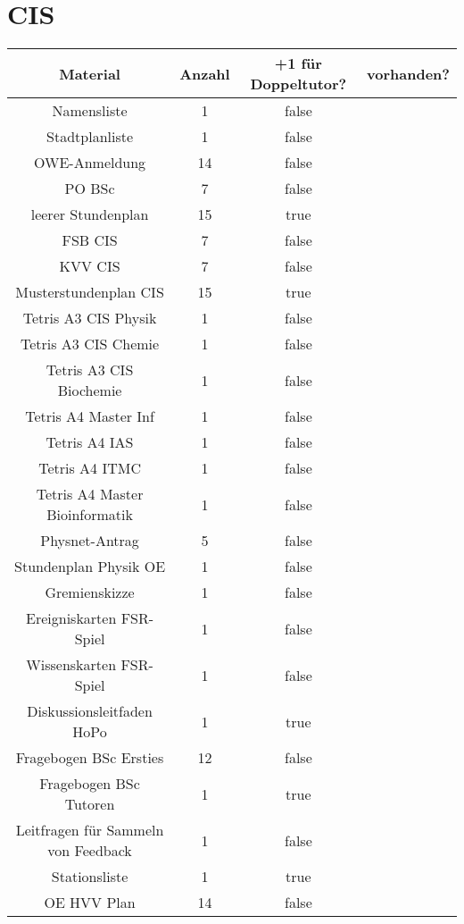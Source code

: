 \documentclass[10pt,a4paper,oneside,ngerman,numbers=noenddot]{scrartcl}
\begin{document}
\section{CIS}

	\begin{tabular}{c|c|c|c}
		\textbf{Material} & \textbf{Anzahl} & \textbf{+1 für Doppeltutor?} & \textbf{vorhanden?} \\
		\hline
		Namensliste & 1 & false & \\
		\hline
		Stadtplanliste & 1 & false & \\
		\hline
		OWE-Anmeldung & 14 & false & \\
		\hline
		PO BSc & 7 & false & \\
		\hline
		leerer Stundenplan & 15 & true & \\
		\hline
		FSB CIS & 7 & false & \\
		\hline
		KVV CIS & 7 & false & \\
		\hline
		Musterstundenplan CIS & 15 & true & \\
		\hline
		Tetris A3 CIS Physik & 1 & false & \\
		\hline
		Tetris A3 CIS Chemie & 1 & false & \\
		\hline
		Tetris A3 CIS Biochemie & 1 & false & \\
		\hline
		Tetris A4 Master Inf & 1 & false & \\
		\hline
		Tetris A4 IAS & 1 & false & \\
		\hline
		Tetris A4 ITMC & 1 & false & \\
		\hline
		Tetris A4 Master Bioinformatik & 1 & false & \\
		\hline
		Physnet-Antrag & 5 & false & \\
		\hline
		Stundenplan Physik OE & 1 & false & \\
		\hline
		Gremienskizze & 1 & false & \\
		\hline
		Ereigniskarten FSR-Spiel & 1 & false & \\
		\hline
		Wissenskarten FSR-Spiel & 1 & false & \\
		\hline
		Diskussionsleitfaden HoPo & 1 & true & \\
		\hline
		Fragebogen BSc Ersties & 12 & false & \\
		\hline
		Fragebogen BSc Tutoren & 1 & true & \\
		\hline
		Leitfragen für Sammeln von Feedback & 1 & false & \\
		\hline
		Stationsliste & 1 & true & \\
		\hline
		OE HVV Plan & 14 & false & \\

\end{tabular}
\end{document}
